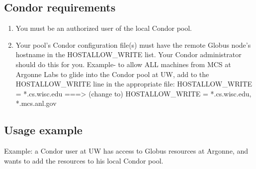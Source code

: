 \subsection{Condor requirements}
\begin{enumerate}
\item You must be an authorized user of the local Condor pool.

\item Your pool's Condor configuration file(s) must have the remote Globus node's
   hostname in the HOSTALLOW\_WRITE list. Your Condor administrator should
   do this for you.
   Example- to allow ALL machines from MCS at Argonne Labs to glide into the
     Condor pool at UW, add to the HOSTALLOW\_WRITE line in the appropriate
      file:
        HOSTALLOW\_WRITE = *.cs.wisc.edu 
        ===> (change to)
        HOSTALLOW\_WRITE = *.cs.wisc.edu, *.mcs.anl.gov
\end{enumerate}

\subsection{Usage example}
Example: a Condor user at UW has access to Globus resources at 
Argonne, and wants to add the resources to his local Condor pool.

